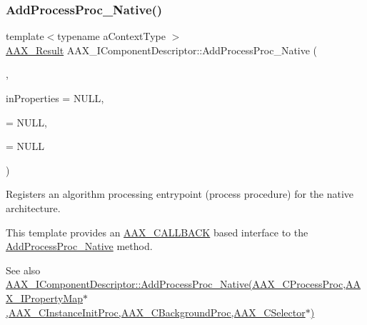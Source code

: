 \subsubsection{\texorpdfstring{AddProcessProc\_Native()}{AddProcessProc\_Native()}\hspace{0.1cm}{\footnotesize\ttfamily [2/2]}}
{\footnotesize\ttfamily template$<$typename a\+Context\+Type $>$ \\
\mbox{\hyperlink{a00392_a4d8f69a697df7f70c3a8e9b8ee130d2f}{A\+A\+X\+\_\+\+Result}} A\+A\+X\+\_\+\+I\+Component\+Descriptor\+::\+Add\+Process\+Proc\+\_\+\+Native (\begin{DoxyParamCaption}\item[{void(\mbox{\hyperlink{a00392_aaa22112139aa627574b1ef562f579d43}{A\+A\+X\+\_\+\+C\+A\+L\+L\+B\+A\+CK}} $\ast$in\+Process\+Proc)(a\+Context\+Type $\ast$const in\+Instances\+Begin \mbox{[}$\,$\mbox{]}, const void $\ast$in\+Instances\+End)}]{,  }\item[{\mbox{\hyperlink{a01869}{A\+A\+X\+\_\+\+I\+Property\+Map}} $\ast$}]{in\+Properties = {\ttfamily NULL},  }\item[{int32\+\_\+t(\mbox{\hyperlink{a00392_aaa22112139aa627574b1ef562f579d43}{A\+A\+X\+\_\+\+C\+A\+L\+L\+B\+A\+CK}} $\ast$in\+Instance\+Init\+Proc)(const a\+Context\+Type $\ast$in\+Instance\+Context\+Ptr, \mbox{\hyperlink{a00491_aff5646376a3c93f032cf2400e0885023}{A\+A\+X\+\_\+\+E\+Component\+Instance\+Init\+Action}} in\+Action)}]{ = {\ttfamily NULL},  }\item[{int32\+\_\+t(\mbox{\hyperlink{a00392_aaa22112139aa627574b1ef562f579d43}{A\+A\+X\+\_\+\+C\+A\+L\+L\+B\+A\+CK}} $\ast$in\+Background\+Proc)(void)}]{ = {\ttfamily NULL} }\end{DoxyParamCaption})\hspace{0.3cm}{\ttfamily [inline]}}



Registers an algorithm processing entrypoint (process procedure) for the native architecture. 

This template provides an \mbox{\hyperlink{a00392_aaa22112139aa627574b1ef562f579d43}{A\+A\+X\+\_\+\+C\+A\+L\+L\+B\+A\+CK}} based interface to the \mbox{\hyperlink{a01781_a1c069508cf54a523905c8160ebf628ad}{Add\+Process\+Proc\+\_\+\+Native}} method.

\begin{DoxySeeAlso}{See also}
\mbox{\hyperlink{a01781_a1c069508cf54a523905c8160ebf628ad}{A\+A\+X\+\_\+\+I\+Component\+Descriptor\+::\+Add\+Process\+Proc\+\_\+\+Native(\+A\+A\+X\+\_\+\+C\+Process\+Proc,\+A\+A\+X\+\_\+\+I\+Property\+Map$\ast$,\+A\+A\+X\+\_\+\+C\+Instance\+Init\+Proc,\+A\+A\+X\+\_\+\+C\+Background\+Proc,\+A\+A\+X\+\_\+\+C\+Selector$\ast$)}}
\end{DoxySeeAlso}

